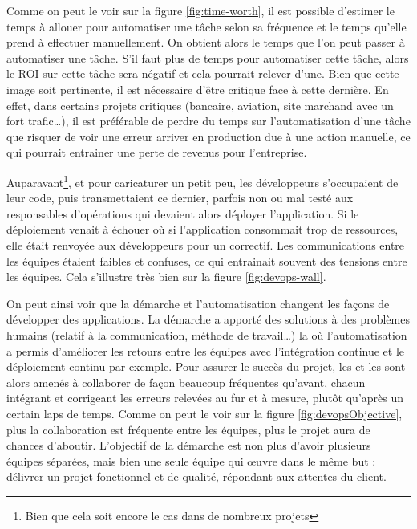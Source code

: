 Comme on peut le voir sur la figure \ref{fig:time-worth}, il est possible d'estimer le temps à allouer pour automatiser une tâche selon sa fréquence et le temps qu'elle prend à effectuer manuellement. On obtient alors le temps que l'on peut passer à automatiser une tâche. S'il faut plus de temps pour automatiser cette tâche, alors le \gls{ROI} sur cette tâche sera négatif et cela pourrait relever d'une. Bien que cette image soit pertinente, il est nécessaire d'être critique face à cette dernière. En effet, dans certains projets critiques (bancaire, aviation, site marchand avec un fort trafic\ldots), il est préférable de perdre du temps sur l'automatisation d'une tâche que risquer de voir une erreur arriver en production due à une action manuelle, ce qui pourrait entrainer une perte de revenus pour l'entreprise.

Auparavant\footnote{Bien que cela soit encore le cas dans de nombreux projets}, et pour caricaturer un petit peu, les développeurs s'occupaient de leur code, puis transmettaient ce dernier, parfois non ou mal testé aux responsables d'opérations qui devaient alors déployer l'application. Si le déploiement venait à échouer où si l'application consommait trop de ressources, elle était renvoyée aux développeurs pour un correctif. Les communications entre les équipes étaient faibles et confuses, ce qui entrainait souvent des tensions entre les équipes. Cela s'illustre très bien sur la figure \ref{fig:devops-wall}.


On peut ainsi voir que la démarche \devops{} et l'automatisation changent les façons de développer des applications. La démarche \devops{} a apporté des solutions à des problèmes humains (relatif à la communication, méthode de travail\ldots) la où l'automatisation a permis d'améliorer les retours entre les équipes avec l'intégration continue et le déploiement continu par exemple. Pour assurer le succès du projet, les \ops{} et les \dev{} sont alors amenés à collaborer de façon beaucoup fréquentes qu'avant, chacun intégrant et corrigeant les erreurs relevées au fur et à mesure, plutôt qu'après un certain laps de temps. Comme on peut le voir sur la figure \ref{fig:devopsObjective}, plus la collaboration est fréquente entre les équipes, plus le projet aura de chances d'aboutir. L'objectif de la démarche \devops{} est non plus d'avoir plusieurs équipes séparées, mais bien une seule équipe qui œuvre dans le même but : délivrer un projet fonctionnel et de qualité, répondant aux attentes du client.

